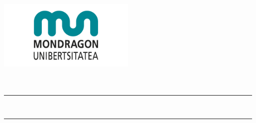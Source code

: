 \thispagestyle{empty}

\newcommand{\HRule}{\rule{\linewidth}{0.5mm}} 

\begin{center}
  \includegraphics[width=0.5\textwidth]{template/figs/mu-logo.jpeg} \\[1.3cm]
   {\Large \masterName}\\
   {\masterSpecialization}\\[1.5cm]

\HRule \\[0.5cm]

{ \LARGE 
\begin{spacing}{1}
  \textbf{\izenburua}
\end{spacing}
}
 \vspace{0.5cm}
\HRule \\[1.0cm]

{ \authorLabel\\}
{\Large \textsl{\egilea}}
\vspace{2.0 cm} 

{\large \textsf{\masterDate}}

\end{center}

